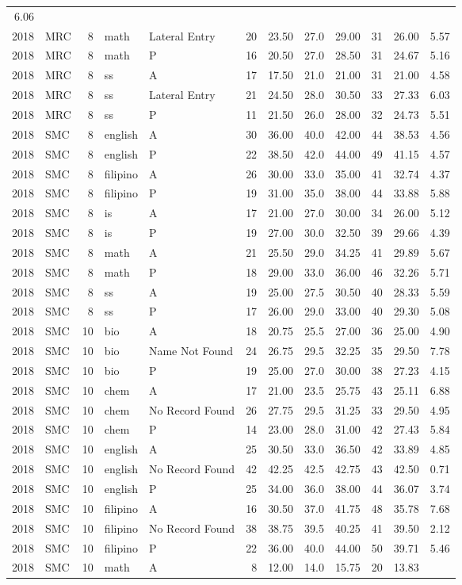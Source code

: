 \documentclass[]{article}
\begin{document}
\begin{longtable}[]{@{}rlrllrrrrrrr@{}}
6.06\tabularnewline
2018 & MRC & 8 & math & Lateral Entry & 20 & 23.50 & 27.0 & 29.00 & 31 &
26.00 & 5.57\tabularnewline
2018 & MRC & 8 & math & P & 16 & 20.50 & 27.0 & 28.50 & 31 & 24.67 &
5.16\tabularnewline
2018 & MRC & 8 & ss & A & 17 & 17.50 & 21.0 & 21.00 & 31 & 21.00 &
4.58\tabularnewline
2018 & MRC & 8 & ss & Lateral Entry & 21 & 24.50 & 28.0 & 30.50 & 33 &
27.33 & 6.03\tabularnewline
2018 & MRC & 8 & ss & P & 11 & 21.50 & 26.0 & 28.00 & 32 & 24.73 &
5.51\tabularnewline
2018 & SMC & 8 & english & A & 30 & 36.00 & 40.0 & 42.00 & 44 & 38.53 &
4.56\tabularnewline
2018 & SMC & 8 & english & P & 22 & 38.50 & 42.0 & 44.00 & 49 & 41.15 &
4.57\tabularnewline
2018 & SMC & 8 & filipino & A & 26 & 30.00 & 33.0 & 35.00 & 41 & 32.74 &
4.37\tabularnewline
2018 & SMC & 8 & filipino & P & 19 & 31.00 & 35.0 & 38.00 & 44 & 33.88 &
5.88\tabularnewline
2018 & SMC & 8 & is & A & 17 & 21.00 & 27.0 & 30.00 & 34 & 26.00 &
5.12\tabularnewline
2018 & SMC & 8 & is & P & 19 & 27.00 & 30.0 & 32.50 & 39 & 29.66 &
4.39\tabularnewline
2018 & SMC & 8 & math & A & 21 & 25.50 & 29.0 & 34.25 & 41 & 29.89 &
5.67\tabularnewline
2018 & SMC & 8 & math & P & 18 & 29.00 & 33.0 & 36.00 & 46 & 32.26 &
5.71\tabularnewline
2018 & SMC & 8 & ss & A & 19 & 25.00 & 27.5 & 30.50 & 40 & 28.33 &
5.59\tabularnewline
2018 & SMC & 8 & ss & P & 17 & 26.00 & 29.0 & 33.00 & 40 & 29.30 &
5.08\tabularnewline
2018 & SMC & 10 & bio & A & 18 & 20.75 & 25.5 & 27.00 & 36 & 25.00 &
4.90\tabularnewline
2018 & SMC & 10 & bio & Name Not Found & 24 & 26.75 & 29.5 & 32.25 & 35
& 29.50 & 7.78\tabularnewline
2018 & SMC & 10 & bio & P & 19 & 25.00 & 27.0 & 30.00 & 38 & 27.23 &
4.15\tabularnewline
2018 & SMC & 10 & chem & A & 17 & 21.00 & 23.5 & 25.75 & 43 & 25.11 &
6.88\tabularnewline
2018 & SMC & 10 & chem & No Record Found & 26 & 27.75 & 29.5 & 31.25 &
33 & 29.50 & 4.95\tabularnewline
2018 & SMC & 10 & chem & P & 14 & 23.00 & 28.0 & 31.00 & 42 & 27.43 &
5.84\tabularnewline
2018 & SMC & 10 & english & A & 25 & 30.50 & 33.0 & 36.50 & 42 & 33.89 &
4.85\tabularnewline
2018 & SMC & 10 & english & No Record Found & 42 & 42.25 & 42.5 & 42.75
& 43 & 42.50 & 0.71\tabularnewline
2018 & SMC & 10 & english & P & 25 & 34.00 & 36.0 & 38.00 & 44 & 36.07 &
3.74\tabularnewline
2018 & SMC & 10 & filipino & A & 16 & 30.50 & 37.0 & 41.75 & 48 & 35.78
& 7.68\tabularnewline
2018 & SMC & 10 & filipino & No Record Found & 38 & 38.75 & 39.5 & 40.25
& 41 & 39.50 & 2.12\tabularnewline
2018 & SMC & 10 & filipino & P & 22 & 36.00 & 40.0 & 44.00 & 50 & 39.71
& 5.46\tabularnewline
2018 & SMC & 10 & math & A & 8 & 12.00 & 14.0 & 15.75 & 20 & 13.83 &

\end{longtable}
\end{document}
